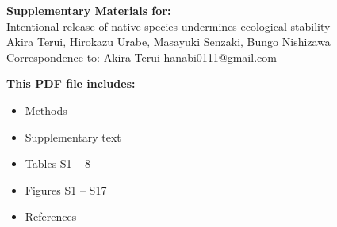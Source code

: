 \begin{center}
\LARGE{\textbf{Supplementary Materials for:}}\\[7.5mm]
\LARGE{Intentional release of native species undermines ecological stability}\\[7.5mm]
\large{Akira Terui, Hirokazu Urabe, Masayuki Senzaki, Bungo Nishizawa}\\[7.5mm]
\large{Correspondence to: Akira Terui hanabi0111@gmail.com}\\[15mm]\end{center}
\begin{flushleft}
\textbf{This PDF file includes:}
\begin{itemize}
\item Methods
\item Supplementary text
\item Tables S1 -- 8
\item Figures S1 -- S17
\item References
\end{itemize}
\end{flushleft}

\newpage